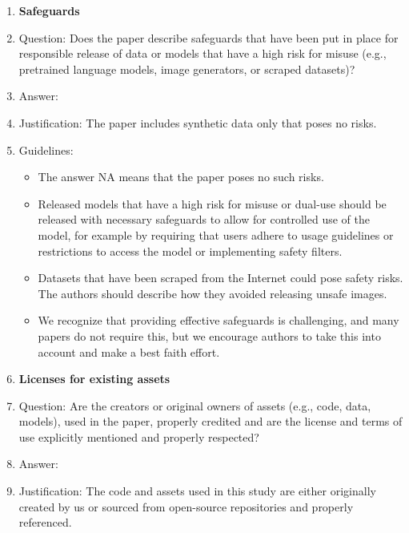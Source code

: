 \documentclass{article}
\begin{document}
\begin{enumerate}
\begin{itemize}
        \item If there are negative societal impacts, the authors could also discuss possible mitigation strategies (e.g., gated release of models, providing defenses in addition to attacks, mechanisms for monitoring misuse, mechanisms to monitor how a system learns from feedback over time, improving the efficiency and accessibility of ML).
    \end{itemize}
\item {\bf Safeguards}
    \item[] Question: Does the paper describe safeguards that have been put in place for responsible release of data or models that have a high risk for misuse (e.g., pretrained language models, image generators, or scraped datasets)?
    \item[] Answer: \answerNA{}
    \item[] Justification: The paper includes synthetic data only that poses no risks.
    \item[] Guidelines:
    \begin{itemize}
        \item The answer NA means that the paper poses no such risks.
        \item Released models that have a high risk for misuse or dual-use should be released with necessary safeguards to allow for controlled use of the model, for example by requiring that users adhere to usage guidelines or restrictions to access the model or implementing safety filters.
        \item Datasets that have been scraped from the Internet could pose safety risks. The authors should describe how they avoided releasing unsafe images.
        \item We recognize that providing effective safeguards is challenging, and many papers do not require this, but we encourage authors to take this into account and make a best faith effort.
    \end{itemize}
\item {\bf Licenses for existing assets}
    \item[] Question: Are the creators or original owners of assets (e.g., code, data, models), used in the paper, properly credited and are the license and terms of use explicitly mentioned and properly respected?
    \item[] Answer: \answerYes{}
    \item[] Justification: The code and assets used in this study are either originally created by us or sourced from open-source repositories and properly referenced.

\end{enumerate}
\end{document}
